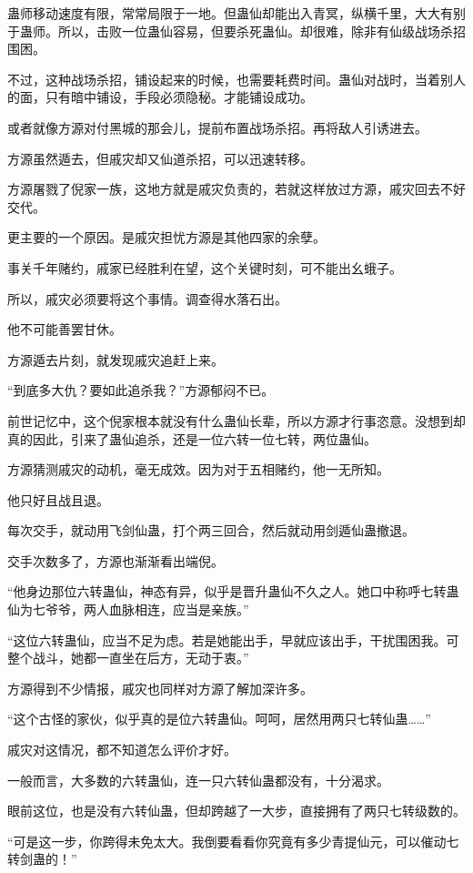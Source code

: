 \begin{this_body}
蛊师移动速度有限，常常局限于一地。但蛊仙却能出入青冥，纵横千里，大大有别于蛊师。所以，击败一位蛊仙容易，但要杀死蛊仙。却很难，除非有仙级战场杀招围困。

不过，这种战场杀招，铺设起来的时候，也需要耗费时间。蛊仙对战时，当着别人的面，只有暗中铺设，手段必须隐秘。才能铺设成功。

或者就像方源对付黑城的那会儿，提前布置战场杀招。再将敌人引诱进去。

方源虽然遁去，但戚灾却又仙道杀招，可以迅速转移。

方源屠戮了倪家一族，这地方就是戚灾负责的，若就这样放过方源，戚灾回去不好交代。

更主要的一个原因。是戚灾担忧方源是其他四家的余孽。

事关千年赌约，戚家已经胜利在望，这个关键时刻，可不能出幺蛾子。

所以，戚灾必须要将这个事情。调查得水落石出。

他不可能善罢甘休。

方源遁去片刻，就发现戚灾追赶上来。

“到底多大仇？要如此追杀我？”方源郁闷不已。

前世记忆中，这个倪家根本就没有什么蛊仙长辈，所以方源才行事恣意。没想到却真的因此，引来了蛊仙追杀，还是一位六转一位七转，两位蛊仙。

方源猜测戚灾的动机，毫无成效。因为对于五相赌约，他一无所知。

他只好且战且退。

每次交手，就动用飞剑仙蛊，打个两三回合，然后就动用剑遁仙蛊撤退。

交手次数多了，方源也渐渐看出端倪。

“他身边那位六转蛊仙，神态有异，似乎是晋升蛊仙不久之人。她口中称呼七转蛊仙为七爷爷，两人血脉相连，应当是亲族。”

“这位六转蛊仙，应当不足为虑。若是她能出手，早就应该出手，干扰围困我。可整个战斗，她都一直坐在后方，无动于衷。”

方源得到不少情报，戚灾也同样对方源了解加深许多。

“这个古怪的家伙，似乎真的是位六转蛊仙。呵呵，居然用两只七转仙蛊……”

戚灾对这情况，都不知道怎么评价才好。

一般而言，大多数的六转蛊仙，连一只六转仙蛊都没有，十分渴求。

眼前这位，也是没有六转仙蛊，但却跨越了一大步，直接拥有了两只七转级数的。

“可是这一步，你跨得未免太大。我倒要看看你究竟有多少青提仙元，可以催动七转剑蛊的！”


\end{this_body}
